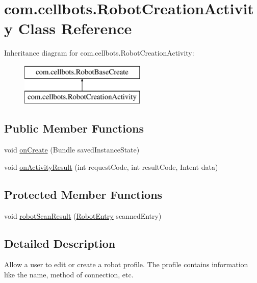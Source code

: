 \hypertarget{classcom_1_1cellbots_1_1_robot_creation_activity}{\section{com.\-cellbots.\-Robot\-Creation\-Activity Class Reference}
\label{classcom_1_1cellbots_1_1_robot_creation_activity}
}
Inheritance diagram for com.\-cellbots.\-Robot\-Creation\-Activity\-:\begin{figure}[H]
\begin{center}
\leavevmode
\includegraphics[height=2.000000cm]{classcom_1_1cellbots_1_1_robot_creation_activity}
\end{center}
\end{figure}
\subsection*{Public Member Functions}
\begin{DoxyCompactItemize}
\item 
void \hyperlink{classcom_1_1cellbots_1_1_robot_creation_activity_a68ba54996597a8266a131e2c67d3c9cb}{on\-Create} (Bundle saved\-Instance\-State)
\item 
void \hyperlink{classcom_1_1cellbots_1_1_robot_creation_activity_a7280119544e94c6dce0d0042ce178709}{on\-Activity\-Result} (int request\-Code, int result\-Code, Intent data)
\end{DoxyCompactItemize}
\subsection*{Protected Member Functions}
\begin{DoxyCompactItemize}
\item 
void \hyperlink{classcom_1_1cellbots_1_1_robot_creation_activity_a6644d24c8f147f3ebc1a132d0c968160}{robot\-Scan\-Result} (\hyperlink{classcom_1_1cellbots_1_1_robot_entry}{Robot\-Entry} scanned\-Entry)
\end{DoxyCompactItemize}


\subsection{Detailed Description}
Allow a user to edit or create a robot profile. The profile contains information like the name, method of connection, etc.

